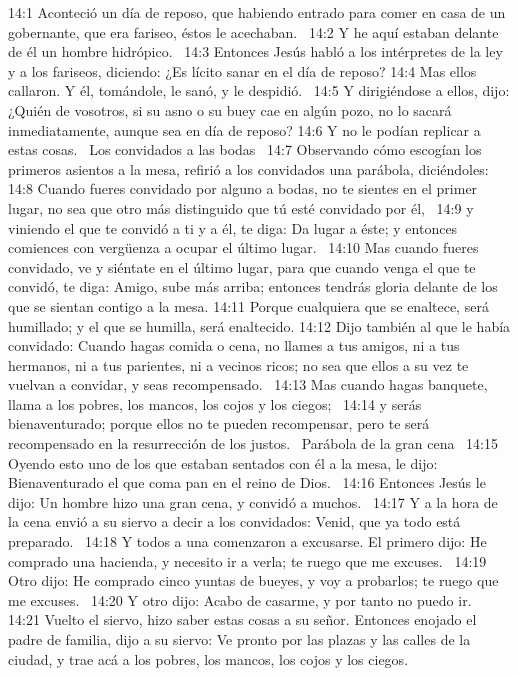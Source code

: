 14:1 Aconteció un día de reposo, que habiendo entrado para comer en casa de un gobernante, que era fariseo, éstos le acechaban.  
14:2 Y he aquí estaban delante de él un hombre hidrópico.  
14:3 Entonces Jesús habló a los intérpretes de la ley y a los fariseos, diciendo: ¿Es lícito sanar en el día de reposo? 
14:4 Mas ellos callaron. Y él, tomándole, le sanó, y le despidió.  
14:5 Y dirigiéndose a ellos, dijo: ¿Quién de vosotros, si su asno o su buey cae en algún pozo, no lo sacará inmediatamente, aunque sea en día de reposo? 
14:6 Y no le podían replicar a estas cosas.  
Los convidados a las bodas  
14:7 Observando cómo escogían los primeros asientos a la mesa, refirió a los convidados una parábola, diciéndoles:  
14:8 Cuando fueres convidado por alguno a bodas, no te sientes en el primer lugar, no sea que otro más distinguido que tú esté convidado por él,  
14:9 y viniendo el que te convidó a ti y a él, te diga: Da lugar a éste; y entonces comiences con vergüenza a ocupar el último lugar.  
14:10 Mas cuando fueres convidado, ve y siéntate en el último lugar, para que cuando venga el que te convidó, te diga: Amigo, sube más arriba; entonces tendrás gloria delante de los que se sientan contigo a la mesa. 
14:11 Porque cualquiera que se enaltece, será humillado; y el que se humilla, será enaltecido. 
14:12 Dijo también al que le había convidado: Cuando hagas comida o cena, no llames a tus amigos, ni a tus hermanos, ni a tus parientes, ni a vecinos ricos; no sea que ellos a su vez te vuelvan a convidar, y seas recompensado.  
14:13 Mas cuando hagas banquete, llama a los pobres, los mancos, los cojos y los ciegos;  
14:14 y serás bienaventurado; porque ellos no te pueden recompensar, pero te será recompensado en la resurrección de los justos.  
Parábola de la gran cena  
14:15 Oyendo esto uno de los que estaban sentados con él a la mesa, le dijo: Bienaventurado el que coma pan en el reino de Dios.  
14:16 Entonces Jesús le dijo: Un hombre hizo una gran cena, y convidó a muchos.  
14:17 Y a la hora de la cena envió a su siervo a decir a los convidados: Venid, que ya todo está preparado.  
14:18 Y todos a una comenzaron a excusarse. El primero dijo: He comprado una hacienda, y necesito ir a verla; te ruego que me excuses.  
14:19 Otro dijo: He comprado cinco yuntas de bueyes, y voy a probarlos; te ruego que me excuses.  
14:20 Y otro dijo: Acabo de casarme, y por tanto no puedo ir.  
14:21 Vuelto el siervo, hizo saber estas cosas a su señor. Entonces enojado el padre de familia, dijo a su siervo: Ve pronto por las plazas y las calles de la ciudad, y trae acá a los pobres, los mancos, los cojos y los ciegos.  
